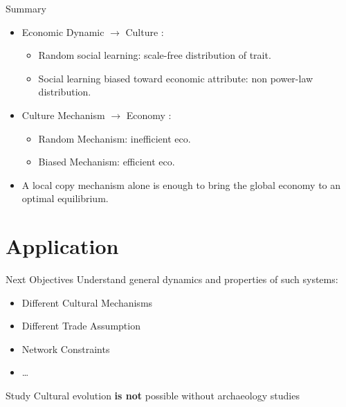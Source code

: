 \documentclass[12pt, notes=show]{beamer}
\begin{document}
\begin{frame}{Summary}
\begin{itemize}
		\vfill
	    \item Economic Dynamic $\rightarrow$ Culture :
			\begin{itemize}
			    \item Random social learning: scale-free distribution of trait. 
			    \item Social learning biased toward economic attribute: non power-law distribution.
			\end{itemize}
		\vfill
	    \item Culture Mechanism $\rightarrow$ Economy : 
		\begin{itemize}
		    \item Random Mechanism: inefficient eco.
		    \item Biased Mechanism: efficient eco.
		\end{itemize}
		\vfill
	\item A local copy mechanism alone is enough to bring the global economy to an optimal equilibrium.
\end{itemize}

\end{frame}
\section{Application}
\begin{frame}{Next Objectives}
    \vfill
    Understand general dynamics and properties of such systems:
    \vfill
	\begin{itemize}
	\item Different Cultural Mechanisms
    \vfill
	\item Different Trade Assumption
    \vfill
	\item Network Constraints
    \vfill
	\item \dots
    \vfill
	\end{itemize}
\end{frame}

\begin{frame}{}

    {\large Study Cultural evolution \textbf{is not} possible without archaeology studies}
    \vspace{.5cm}

	
\end{frame}
\end{document}
